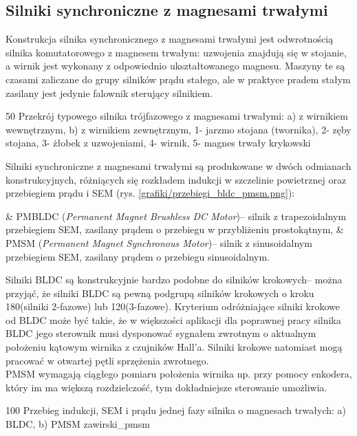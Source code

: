 \subsection{Silniki synchroniczne z magnesami trwałymi}

Konstrukcja silnika synchronicznego z magnesami trwałymi jest odwrotnością silnika komutatorowego z magnesem trwałym: uzwojenia znajdują się w stojanie, a wirnik jest wykonany z odpowiednio ukształtowanego magnesu. Maszyny te są czasami  zaliczane do grupy silników prądu stałego, ale w praktyce pradem stałym zasilany jest jedynie falownik sterujący silnikiem. 

		{50}
		{Przekrój typowego silnika trójfazowego z magnesami trwałymi: a) z wirnikiem wewnętrznym, b) z wirnikiem zewnętrznym, 1- jarzmo stojana (twornika), 2- zęby stojana, 3- żłobek z uzwojeniami, 4- wirnik, 5- magnes trwały}
		{krykowski}
		
Silniki synchroniczne z magnesami trwałymi są produkowane w dwóch odmianach konstrukcyjnych, różniących się rozkładem indukcji w szczelinie powietrznej oraz przebiegiem prądu i SEM (rys. \ref{grafiki/przebiegi_bldc_pmsm.png}):

\begin{easylist}
	& PMBLDC ({\it Permanent Magnet Brushless DC Motor})-- silnik z trapezoidalnym przebiegiem SEM, zasilany prądem o przebiegu w przybliżeniu prostokątnym,
	& PMSM ({\it Permanent Magnet Synchronous Motor})-- silnik z sinusoidalnym przebiegiem SEM, zasilany prądem o przebiegu sinusoidalnym.
	\\
\end{easylist} 
		
Silniki BLDC są konstrukcyjnie bardzo podobne do silników krokowych-- można przyjąć, że silniki BLDC są pewną podgrupą silników krokowych o kroku 180\degree (silniki 2-fazowe) lub 120\degree (3-fazowe). Kryterium odróżniające silniki krokowe od BLDC może być takie, że w większości aplikacji dla poprawnej pracy silnika BLDC jego sterownik musi dysponować sygnałem zwrotnym o aktualnym położeniu kątowym wirnika z czujników Hall'a. Silniki krokowe natomiast mogą pracować w otwartej pętli sprzężenia zwrotnego. \\

PMSM wymagają ciągłego pomiaru położenia wirnika np. przy pomocy enkodera, który im ma większą rozdzielczość, tym dokładniejsze sterowanie umożliwia.

		{100}
		{Przebieg indukcji, SEM i prądu jednej fazy silnika o magnesach trwałych: a) BLDC, b) PMSM}
		{zawirski_pmsm} 

